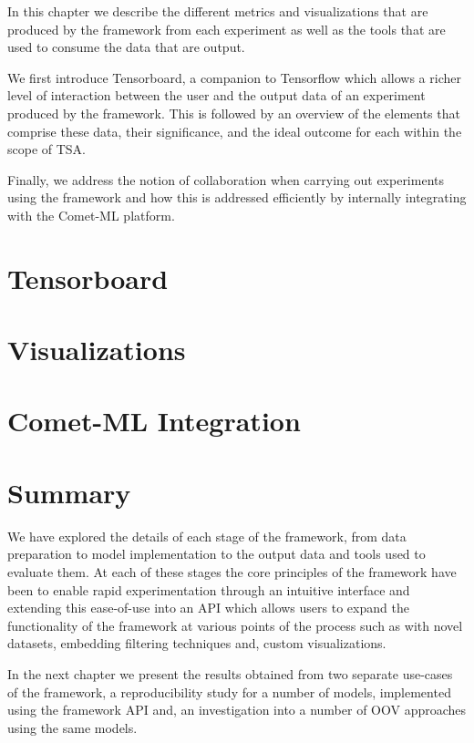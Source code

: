 \documentclass[../../fyp.tex]{subfiles}
\begin{document}
 
In this chapter we describe the different metrics and visualizations that are produced by the framework from each experiment as well as the tools that are used to consume the data that are output. 

We first introduce Tensorboard, a companion to Tensorflow which allows a richer level of interaction between the user and the output data of an experiment produced by the framework. This is followed by an overview of the elements that comprise these data, their significance, and the ideal outcome for each within the scope of TSA. 

Finally, we address the notion of collaboration when carrying out experiments using the framework and how this is addressed efficiently by internally integrating with the Comet-ML platform.     

\section{Tensorboard}


\section{Visualizations}


\section{Comet-ML Integration}


\section{Summary}
We have explored the details of each stage of the framework, from data preparation to model implementation to the output data and tools used to evaluate them. At each of these stages the core principles of the framework have been to enable rapid experimentation through an intuitive interface and extending this ease-of-use into an API which allows users to expand the functionality of the framework at various points of the process such as with novel datasets, embedding filtering techniques and, custom visualizations.

In the next chapter we present the results obtained from two separate use-cases of the framework, a reproducibility study for a number of models, implemented using the framework API and, an investigation into a number of OOV approaches using the same models.  
\end{document}
